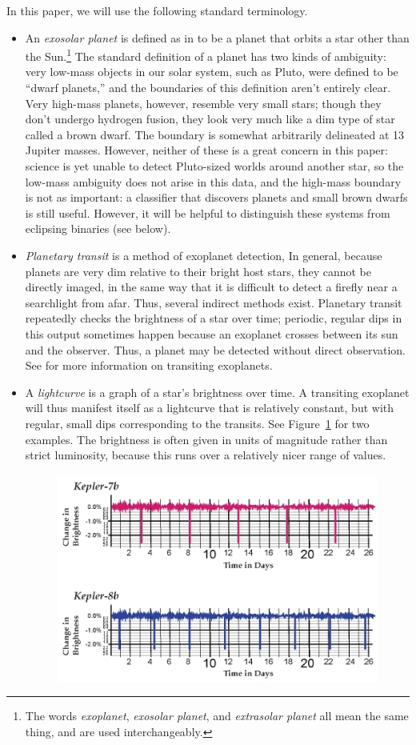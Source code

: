 \documentclass{amsart}
\begin{document}
In this paper, we will use the following standard terminology.
\begin{itemize}
	\item An \emph{exosolar planet} is defined as in \cite{Ovr} to be a planet that orbits a star other than the Sun.\footnote{The words \emph{exoplanet}, \emph{exosolar planet}, and \emph{extrasolar planet} all mean the same thing, and are used interchangeably.} The standard definition of a planet has two kinds of ambiguity: very low-mass objects in our solar system, such as Pluto, were defined to be ``dwarf planets,'' and the boundaries of this definition aren't entirely clear. Very high-mass planets, however, resemble very small stars; though they don't undergo hydrogen fusion, they look very much like a dim type of star called a brown dwarf. The boundary is somewhat arbitrarily delineated at 13 Jupiter masses. However, neither of these is a great concern in this paper: science is yet unable to detect Pluto-sized worlds around another star, so the low-mass ambiguity does not arise in this data, and the high-mass boundary is not as important: a classifier that discovers planets and small brown dwarfs is still useful. However, it will be helpful to distinguish these systems from eclipsing binaries (see below).
	\item \emph{Planetary transit} is a method of exoplanet detection, In general, because planets are very dim relative to their bright host stars, they cannot be directly imaged, in the same way that it is difficult to detect a firefly near a searchlight from afar. Thus, several indirect methods exist. Planetary transit repeatedly checks the brightness of a star over time; periodic, regular dips in this output sometimes happen because an exoplanet crosses between its sun and the observer. Thus, a planet may be detected without direct observation. See \cite{Trs} for more information on transiting exoplanets.
	\item A \emph{lightcurve} is a graph of a star's brightness over time. A transiting exoplanet will thus manifest itself as a lightcurve that is relatively constant, but with regular, small dips corresponding to the transits. See Figure~\ref{curves} for two examples.
	 The brightness is often given in units of magnitude rather than strict luminosity, because this runs over a relatively nicer range of values.
	\begin{figure}
	\centering
	\label{curves}
	\includegraphics[width=6in]{transit_lightcurve}

\end{figure}
\end{itemize}
\end{document}
